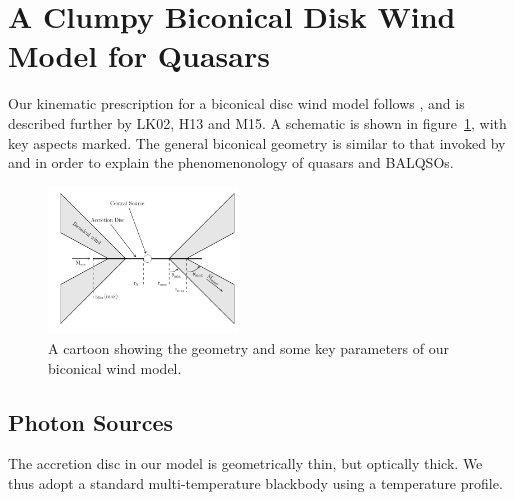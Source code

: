\documentclass[preprint, a4paper, 11pt]{aastex}
\begin{document}




\section{A Clumpy Biconical Disk Wind Model for Quasars}

Our kinematic prescription for a biconical disc wind model
follows \cite{SV93}, and is described further by
LK02, H13 and M15. A schematic is shown in figure~\ref{fig:cartoon},
with key aspects marked. The general biconical
geometry is similar to that invoked by \cite{MCGV95} and 
\cite{elvis2000} in order to explain the phenomenonology
of quasars and BALQSOs.


\begin{figure} 
\centering
\includegraphics[width=0.45\textwidth]{figures/fig2_cartoon.png}
\caption
{
A cartoon showing the geometry and some key parameters of
our biconical wind model.
}
\label{fig:cartoon}
\end{figure} 





\subsection{Photon Sources}


The accretion disc in our model is geometrically thin, but optically thick.
We thus adopt a standard multi-temperature blackbody
using a \cite{shakurasunyaev1973} temperature profile. 
\end{document}
